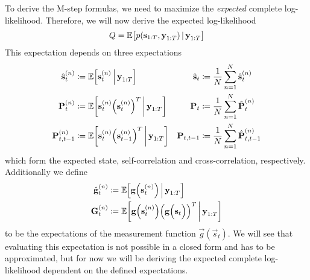 To derive the M-step formulas, we need to maximize the \emph{expected} complete log-likelihood. Therefore, we will now derive the expected log-likelihood
\begin{equation*}
	Q = \mathbb{E}\big[ p(\boldsymbol{\mathrm{s}}_{1:T}, \boldsymbol{\mathrm{y}}_{1:T}) \,\vert\, \boldsymbol{\mathrm{y}}_{1:T} \big]
\end{equation*}
This expectation depends on three expectations
\begin{align*}
	\hat{\boldsymbol{\mathrm{s}}}_t^{(n)}    & \coloneqq \mathbb{E}\Big[\boldsymbol{\mathrm{s}}_t^{(n)} \,\Big\vert\, \boldsymbol{\mathrm{y}}_{1:T}\Big]                                      & \hat{\boldsymbol{\mathrm{s}}}_t    & \coloneqq \frac{1}{N} \sum_{n = 1}^{N} \hat{\boldsymbol{\mathrm{s}}}_t^{(n)}          \\
	\boldsymbol{\mathrm{P}}_t^{(n)}          & \coloneqq \mathbb{E}\bigg[\boldsymbol{\mathrm{s}}_t^{(n)} \Big(\boldsymbol{\mathrm{s}}_t^{(n)}\Big)^T \,\bigg\vert\, \boldsymbol{\mathrm{y}}_{1:T}\bigg]       & \boldsymbol{\mathrm{P}}_t          & \coloneqq \frac{1}{N} \sum_{n = 1}^{N} \hat{\boldsymbol{\mathrm{P}}}_t^{(n)}          \\
	\boldsymbol{\mathrm{P}}_{t, t - 1}^{(n)} & \coloneqq \mathbb{E}\bigg[\boldsymbol{\mathrm{s}}_t^{(n)} \Big(\boldsymbol{\mathrm{s}}_{t - 1}^{(n)}\Big)^T \,\bigg\vert\, \boldsymbol{\mathrm{y}}_{1:T}\bigg] & \boldsymbol{\mathrm{P}}_{t, t - 1} & \coloneqq \frac{1}{N} \sum_{n = 1}^{N} \hat{\boldsymbol{\mathrm{P}}}_{t, t - 1}^{(n)}
\end{align*}
which form the expected state, self-correlation and cross-correlation, respectively. Additionally we define
\begin{align}
	\hat{\boldsymbol{\mathrm{g}}}_t^{(n)} & \coloneqq \mathbb{E}\Big[\boldsymbol{\mathrm{g}}\Big(\boldsymbol{\mathrm{s}}_t^{(n)}\Big) \,\Big\vert\, \boldsymbol{\mathrm{y}}_{1:T}\Big]    \label{eqn:expectedMeasurement}                                              \\
	\boldsymbol{\mathrm{G}}_t^{(n)}       & \coloneqq \mathbb{E}\bigg[\boldsymbol{\mathrm{g}}\Big(\boldsymbol{\mathrm{s}}_t^{(n)}\Big) \Big(\boldsymbol{\mathrm{g}}\Big(\boldsymbol{\mathrm{s}}_t\Big)\Big)^T \,\bigg\vert\, \boldsymbol{\mathrm{y}}_{1:T}\bigg]    \label{eqn:expectedMeasurementMat}
\end{align}
to be the expectations of the measurement function \( \vec{g}(\vec{s}_t) \). We will see that evaluating this expectation is not possible in a closed form and has to be approximated, but for now we will be deriving the expected complete log-likelihood dependent on the defined expectations.

